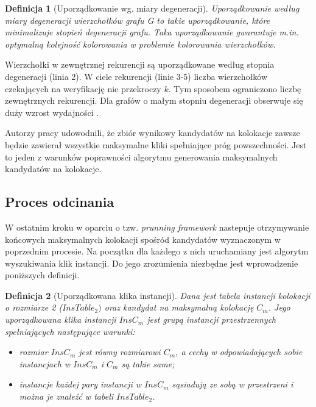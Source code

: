 \documentclass[12pt]{article}
\newtheorem{defin}{Definicja}
\begin{document}
\begin{defin}[Uporządkowanie wg. miary degeneracji]
Uporządkowanie według miary degeneracji wierzchołków grafu G to takie uporządkowanie, które minimalizuje stopień degeneracji grafu. Taka uporządkowanie gwarantuje m.in. optymalną kolejność kolorowania w problemie kolorowania wierzchołków.
\end{defin}

Wierzchołki w zewnętrznej rekurencji są uporządkowane według stopnia degeneracji (linia 2). W ciele rekurencji (linie 3-5) liczba wierzchołków czekających na weryfikację nie przekroczy $ k $. Tym sposobem ograniczono liczbę zewnętrznych rekurencji. Dla grafów o małym stopniu degeneracji obserwuje się duży wzrost wydajności \cite{degenerat}.

Autorzy pracy \cite{wang} udowodnili, że zbiór wynikowy kandydatów na kolokacje zawsze będzie zawierał wszystkie maksymalne kliki spełniające próg powszechności. Jest to jeden z warunków poprawności algorytmu generowania maksymalnych kandydatów na kolokacje.

\subsection{Proces odcinania}

W ostatnim kroku w oparciu o tzw. \textit{prunning framework} \cite{wang} nastepuje otrzymywanie końcowych maksymalnych kolokacji spośród kandydatów wyznaczonym w poprzednim procesie. Na początku dla każdego z nich uruchamiany jest algorytm wyszukiwania klik instancji. Do jego zrozumienia niezbędne jest wprowadzenie poniższych definicji.

\begin{defin}[Uporządkowana klika instancji]
Dana jest tabela instancji kolokacji o rozmiarze 2 ($ InsTable_{2}) $ oraz kandydat na maksymalną kolokację $ C_{m} $. Jego uporządkowana klika instancji $ InsC_{m} $ jest grupą instancji przestrzennych spełniających następujące warunki:
\begin{itemize}
\item rozmiar $ InsC_{m} $ jest równy rozmiarowi $ C_{m} $, a cechy w odpowiadających sobie instancjach w $ InsC_{m} $ i $ C_{m} $ są takie same; %
\item instancje każdej pary instancji w $ InsC_{m} $ sąsiadują ze sobą w przestrzeni i można je znaleźć w tabeli  $ InsTable_{2} $.
\end{itemize}
\end{defin}
\end{document}

